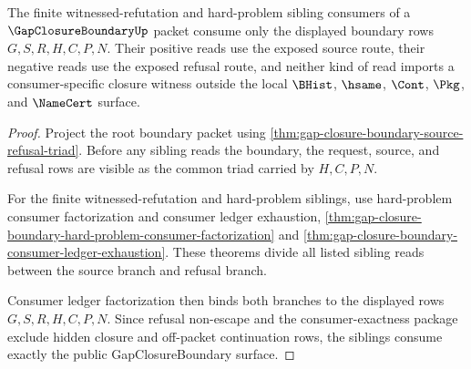 \begin{theorem}
\label{thm:gap-closure-boundary-hard-problem-route-exhaustion}
The finite witnessed-refutation and hard-problem sibling consumers of a $\GapClosureBoundaryUp$ packet consume only the displayed boundary rows $G,S,R,H,C,P,N$. Their positive reads use the exposed source route, their negative reads use the exposed refusal route, and neither kind of read imports a consumer-specific closure witness outside the local $\BHist$, $\hsame$, $\Cont$, $\Pkg$, and $\NameCert$ surface.
\end{theorem}
\begin{proof}
Project the root boundary packet using \autoref{thm:gap-closure-boundary-source-refusal-triad}. Before any sibling reads the boundary, the request, source, and refusal rows are visible as the common triad carried by $H,C,P,N$.

For the finite witnessed-refutation and hard-problem siblings, use hard-problem consumer factorization and consumer ledger exhaustion, \autoref{thm:gap-closure-boundary-hard-problem-consumer-factorization} and \autoref{thm:gap-closure-boundary-consumer-ledger-exhaustion}. These theorems divide all listed sibling reads between the source branch and refusal branch.

Consumer ledger factorization then binds both branches to the displayed rows $G,S,R,H,C,P,N$. Since refusal non-escape and the consumer-exactness package exclude hidden closure and off-packet continuation rows, the siblings consume exactly the public GapClosureBoundary surface.
\end{proof}
